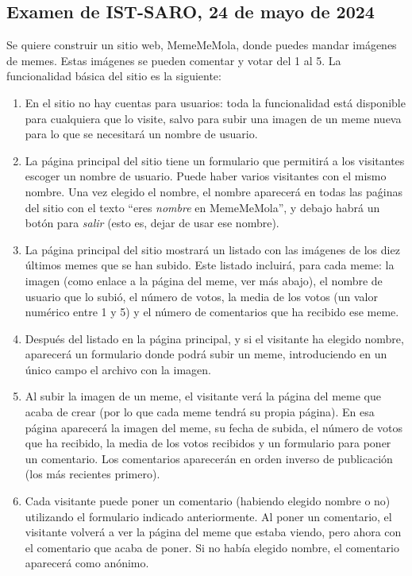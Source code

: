 
\subsection{Examen de IST-SARO, 24 de mayo de 2024}

Se quiere construir un sitio web, MemeMeMola, donde puedes mandar imágenes de memes. Estas imágenes se pueden comentar y votar del 1 al 5. La funcionalidad básica del sitio es la siguiente:

\begin{enumerate}
  \item En el sitio no hay cuentas para usuarios: toda la funcionalidad está disponible para cualquiera que lo visite, salvo para subir una imagen de un meme nueva para lo que se necesitará un nombre de usuario.
  \item La página principal del sitio tiene un formulario que permitirá a los visitantes escoger un nombre de usuario. Puede haber varios visitantes con el mismo nombre. Una vez elegido el nombre, el nombre aparecerá en todas las paǵinas del sitio con el texto ``eres \emph{nombre} en MemeMeMola'', y debajo habrá un botón para \emph{salir} (esto es, dejar de usar ese nombre).
  \item La página principal del sitio mostrará un listado con las imágenes de los diez últimos memes que se han subido. Este listado incluirá, para cada meme: la imagen (como enlace a la página del meme, ver más abajo), el nombre de usuario que lo subió, el número de votos, la media de los votos (un valor numérico entre 1 y 5) y el número de comentarios que ha recibido ese meme. 
  \item Después del listado en la página principal, y si el visitante ha elegido nombre, aparecerá un formulario donde podrá subir un meme, introduciendo en un único campo el archivo con la imagen.
  \item Al subir la imagen de un meme, el visitante verá la página del meme que acaba de crear (por lo que cada meme tendrá su propia página). En esa página aparecerá la imagen del meme, su fecha de subida, el número de votos que ha recibido, la media de los votos recibidos y un formulario para poner un comentario. Los comentarios aparecerán en orden inverso de publicación (los más recientes primero).
  \item Cada visitante puede poner un comentario (habiendo elegido nombre o no) utilizando el formulario indicado anteriormente. Al poner un comentario, el visitante volverá a ver la página del meme que estaba viendo, pero ahora con el comentario que acaba de poner. Si no había elegido nombre, el comentario aparecerá como anónimo.

\end{enumerate}
